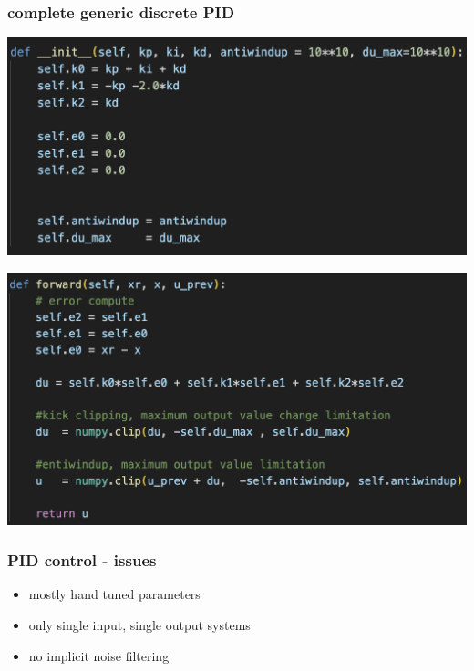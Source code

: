 \documentclass{beamer}
\begin{document}
\begin{frame}
  
  \frametitle{\bf complete generic discrete PID}

  {\centering \includegraphics[scale=0.4]{../images/control/pid_init.png}}

  {\centering \includegraphics[scale=0.4]{../images/control/pid_main.png}}

  
\end{frame}



\begin{frame}
  
  \frametitle{\bf PID control - issues}

  \begin{itemize}
    \item mostly hand tuned parameters
    \item only single input, single output systems
    \item no implicit noise filtering
  \end{itemize}


\end{frame}
\end{document}
